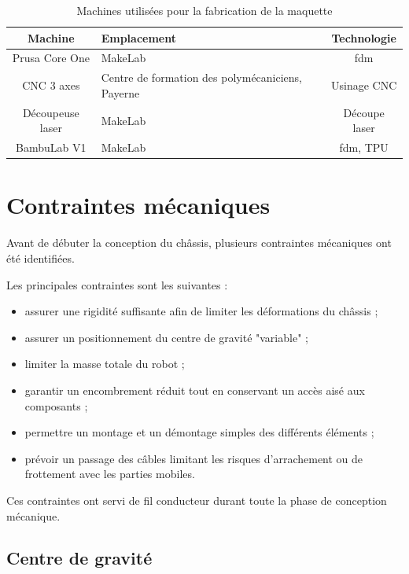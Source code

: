 \begin{table}[H]
\centering
\begin{tabular}{|c|p{6cm}|c|}
\hline
\textbf{Machine} & \textbf{Emplacement} & \textbf{Technologie} \\
\hline
Prusa Core One & MakeLab & \acrshort{fdm} \\
\hline
CNC 3 axes & Centre de formation des polymécaniciens, Payerne & Usinage CNC \\
\hline
Découpeuse laser & MakeLab & Découpe laser \\
\hline
BambuLab V1 & MakeLab & \acrshort{fdm}, TPU \\
\hline
\end{tabular}
\caption{Machines utilisées pour la fabrication de la maquette}
\label{tab:machines}
\end{table}

\section{Contraintes mécaniques}

Avant de débuter la conception du châssis, plusieurs contraintes mécaniques ont été identifiées.

Les principales contraintes sont les suivantes :

\begin{itemize}
    
    \item assurer une rigidité suffisante afin de limiter les déformations du châssis ;
    \item assurer un positionnement du centre de gravité "variable" ;
    \item limiter la masse totale du robot ; 
    \item garantir un encombrement réduit tout en conservant un accès aisé aux composants ;
    \item permettre un montage et un démontage simples des différents éléments ;
    \item prévoir un passage des câbles limitant les risques d'arrachement ou de frottement avec les parties mobiles.
\end{itemize}

Ces contraintes ont servi de fil conducteur durant toute la phase de conception mécanique.

\subsection{Centre de gravité}

